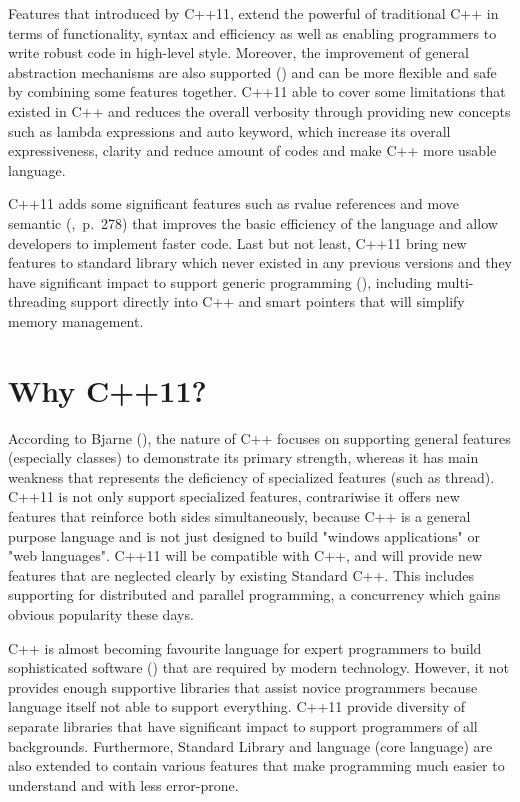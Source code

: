 \documentclass[11pt]{report}
\begin{document}
Features that introduced by C++11, extend the powerful of traditional C++ in terms of functionality, syntax and efficiency as well as enabling programmers to write robust code in high-level style. Moreover, the improvement of general abstraction mechanisms are also supported (\cite{Stroustrup:2012:Cpp11}) and can be more flexible and safe by combining some features together. C++11 able to cover some limitations that existed in C++ and reduces the overall verbosity through providing new concepts such as lambda expressions and auto keyword, which increase its overall expressiveness, clarity and  reduce amount of codes and make C++ more usable language.

C++11 adds some significant features such as rvalue references and move semantic (\cite{Gregorie:professionalcpp},~p.~278) that improves the basic efficiency of the language and allow developers to implement faster code. Last but not least, C++11 bring new features to standard library which never existed in any previous versions and they have significant impact to support generic programming (\cite{Stroustrup:2012:Cpp11}), including multi-threading support directly into C++ and smart pointers that will simplify memory management.

\section{Why C++11?}
\label{sec: why C++11}
According to Bjarne (\cite{Stroustrup:2005:Cpp}), the nature of C++ focuses on supporting general features (especially classes) to demonstrate its primary strength, whereas it has main weakness that represents the deficiency of specialized features (such as thread). C++11 is not  only  support specialized features, contrariwise it offers new features that reinforce both sides simultaneously, because C++ is a general purpose language and is not just designed to build "windows applications" or "web languages". C++11 will be compatible with C++, and will provide new features that are neglected clearly by existing Standard C++. This includes supporting for distributed and parallel programming, a concurrency which gains obvious popularity these days.

C++ is almost becoming favourite language for expert programmers to build sophisticated software (\cite{Stroustrup:2005:Design}) that are required by modern technology. However, it not provides enough supportive libraries that assist novice programmers because language itself not able to support everything. C++11 provide diversity of separate libraries that have significant impact to support programmers of all backgrounds. Furthermore, Standard Library and language (core language) are also extended to contain various features that make programming much easier to understand and with less error-prone.
\end{document}
